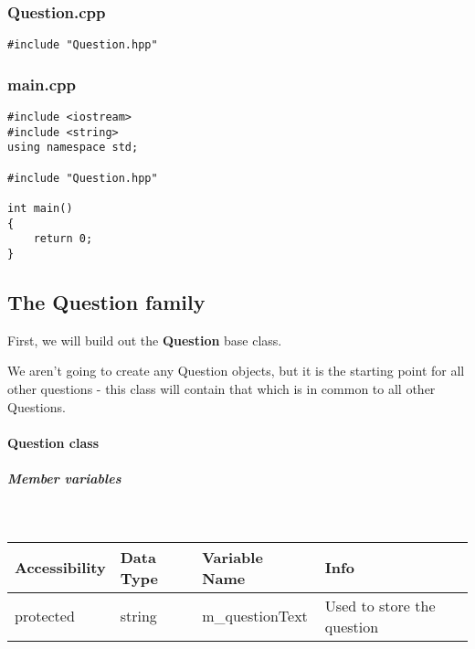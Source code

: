 \documentclass[a4paper,12pt]{book}
\begin{document}
            
                \subsubsection*{Question.cpp}
\begin{lstlisting}[style=code]
#include "Question.hpp"
\end{lstlisting}

            
                \subsubsection*{main.cpp}
\begin{lstlisting}[style=code]
#include <iostream>
#include <string>
using namespace std;

#include "Question.hpp"

int main()
{
    return 0;
}

\end{lstlisting}

            \newpage
            \subsection*{The Question family}

            First, we will build out the \textbf{ Question } base class.

            We aren't going to create any Question objects, but it is the
            starting point for all other questions - this class will contain
            that which is in common to all other Questions.

                    \paragraph{ Question class }
                    
                        \subparagraph{ Member variables } ~\\
                            
                            \begin{tabular}{ l l l l }
                                Accessibility & Data Type & Variable Name & Info \\ \hline{}
                                protected & string & m\_questionText & Used to store the question
                            \end{tabular}
                        
\end{document}
